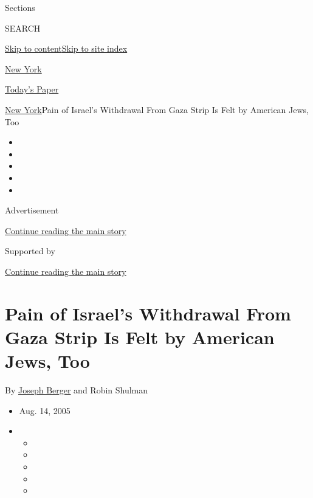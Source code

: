 Sections

SEARCH

\protect\hyperlink{site-content}{Skip to
content}\protect\hyperlink{site-index}{Skip to site index}

\href{https://www.nytimes.com/section/nyregion}{New York}

\href{https://myaccount.nytimes.com/auth/login?response_type=cookie\&client_id=vi}{}

\href{https://www.nytimes.com/section/todayspaper}{Today's Paper}

\href{/section/nyregion}{New York}\textbar{}Pain of Israel's Withdrawal
From Gaza Strip Is Felt by American Jews, Too

\begin{itemize}
\item
\item
\item
\item
\item
\end{itemize}

Advertisement

\protect\hyperlink{after-top}{Continue reading the main story}

Supported by

\protect\hyperlink{after-sponsor}{Continue reading the main story}

\hypertarget{pain-of-israels-withdrawal-from-gaza-strip-is-felt-by-american-jews-too}{%
\section{Pain of Israel's Withdrawal From Gaza Strip Is Felt by American
Jews,
Too}\label{pain-of-israels-withdrawal-from-gaza-strip-is-felt-by-american-jews-too}}

By \href{https://www.nytimes.com/by/joseph-berger}{Joseph Berger} and
Robin Shulman

\begin{itemize}
\item
  Aug. 14, 2005
\item
  \begin{itemize}
  \item
  \item
  \item
  \item
  \item
  \end{itemize}
\end{itemize}

